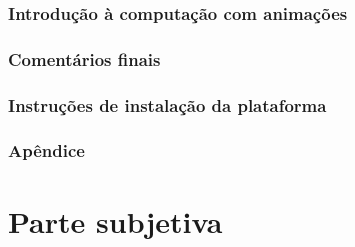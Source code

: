 \documentclass[a4paper,12pt,titlepage]{article}
\begin{document}
\section{Introdução à computação com animações} \label{ep}

\newpage

\section{Comentários finais} \label{comentarios}

\newpage

%
%
\newpage

\section{Instruções de instalação da plataforma} \label{instalacao}

\newpage

\section{Apêndice} \label{apendice}

\newpage

\part{Parte subjetiva}

\newpage 
\end{document}
